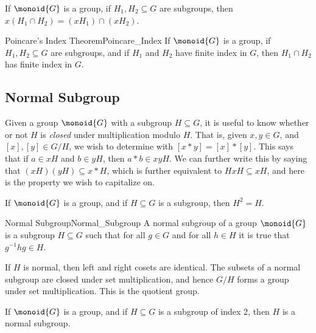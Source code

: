 \documentclass{book}                                                           %
\begin{document}
            \begin{theorem}
                If $\monoid{G}$ is a group, if $H_{1},H_{2}\subseteq{G}$ are
                subgroups, then $x(H_{1}\cap{H}_{2})=(xH_{1})\cap(xH_{2})$.
            \end{theorem}
            \begin{ftheorem}{Poincare's Index Theorem}{Poincare_Index}
                If $\monoid{G}$ is a group, if $H_{1},H_{2}\subseteq{G}$ are
                subgroups, and if $H_{1}$ and $H_{2}$ have finite index
                in $G$, then $H_{1}\cap{H}_{2}$ has finite index in $G$.
            \end{ftheorem}
        \subsection{Normal Subgroup}
            Given a group $\monoid{G}$ with a subgroup $H\subseteq{G}$, it
            is useful to know whether or not $H$ is \textit{closed} under
            multiplication modulo $H$. That is, given $x,y\in{G}$, and
            $[x],[y]\in{G}/H$, we wish to determine with $[x*y]=[x]*[y]$.
            This says that if $a\in{x}H$ and $b\in{y}H$, then $a*b\in{x}yH$.
            We can further write this by saying that
            $(xH)(yH)\subseteq{x}*H$, which is further equivalent to
            $HxH\subseteq{x}H$, and here is the property we wish to
            capitalize on.
            \begin{theorem}
                If $\monoid{G}$ is a group, and if $H\subseteq{G}$ is a
                subgroup, then $H^{2}=H$.
            \end{theorem}
            \begin{fdefinition}{Normal Subgroup}{Normal_Subgroup}
                A normal subgroup of a group $\monoid{G}$ is a subgroup
                $H\subseteq{G}$ such that for all $g\in{G}$ and for all
                $h\in{H}$ it is true that $g^{\minus{1}}hg\in{H}$.
            \end{fdefinition}
            If $H$ is normal, then left and right cosets are identical.
            The subsets of a normal subgroup are closed under set
            multiplication, and hence $G/H$ forms a group under set
            multiplication. This is the quotient group.
            \begin{theorem}
                If $\monoid{G}$ is a group, and if $H\subseteq{G}$ is a
                subgroup of index 2, then $H$ is a normal subgroup.
            \end{theorem}
\end{document}
